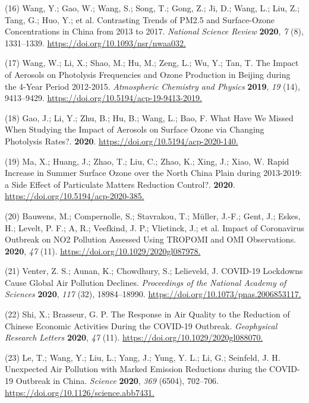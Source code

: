 \documentclass[10pt]{article}
\begin{document}
\label{csl:16}(16) Wang, Y.; Gao, W.; Wang, S.; Song, T.; Gong, Z.; Ji, D.; Wang, L.; Liu, Z.; Tang, G.; Huo, Y.; et al. {Contrasting Trends of {PM}2.5 and Surface-Ozone Concentrations in China from 2013 to 2017}. \textit{National Science Review} \textbf{2020}, \textit{7} (8), 1331–1339. \url{https://doi.org/10.1093/nsr/nwaa032.}

\label{csl:17}(17) Wang, W.; Li, X.; Shao, M.; Hu, M.; Zeng, L.; Wu, Y.; Tan, T. {The Impact of Aerosols on Photolysis Frequencies and Ozone Production in  Beijing during the 4-Year Period 2012-2015}. \textit{Atmospheric Chemistry and Physics} \textbf{2019}, \textit{19} (14), 9413–9429. \url{https://doi.org/10.5194/acp-19-9413-2019.}

\label{csl:18}(18) Gao, J.; Li, Y.; Zhu, B.; Hu, B.; Wang, L.; Bao, F. {What Have We Missed When Studying the Impact of Aerosols on Surface Ozone via Changing Photolysis Rates?}. \textbf{2020}. \url{https://doi.org/10.5194/acp-2020-140.}

\label{csl:19}(19) Ma, X.; Huang, J.; Zhao, T.; Liu, C.; Zhao, K.; Xing, J.; Xiao, W. {Rapid Increase in Summer Surface Ozone over the North China Plain during 2013-2019: a Side Effect of Particulate Matters Reduction Control?}. \textbf{2020}. \url{https://doi.org/10.5194/acp-2020-385.}

\label{csl:20}(20) Bauwens, M.; Compernolle, S.; Stavrakou, T.; Müller, J.-F.; Gent, J.; Eskes, H.; Levelt, P. F.; A, R.; Veefkind, J. P.; Vlietinck, J.; et al. {Impact of Coronavirus Outbreak on NO2 Pollution Assessed Using TROPOMI and OMI Observations}. \textbf{2020}, \textit{47} (11). \url{https://doi.org/10.1029/2020gl087978.}

\label{csl:21}(21) Venter, Z. S.; Aunan, K.; Chowdhury, S.; Lelieveld, J. {{COVID}-19 Lockdowns Cause Global Air Pollution Declines}. \textit{Proceedings of the National Academy of Sciences} \textbf{2020}, \textit{117} (32), 18984–18990. \url{https://doi.org/10.1073/pnas.2006853117.}

\label{csl:22}(22) Shi, X.; Brasseur, G. P. {The Response in Air Quality to the Reduction of Chinese Economic Activities During the {COVID}-19 Outbreak}. \textit{Geophysical Research Letters} \textbf{2020}, \textit{47} (11). \url{https://doi.org/10.1029/2020gl088070.}

\label{csl:23}(23) Le, T.; Wang, Y.; Liu, L.; Yang, J.; Yung, Y. L.; Li, G.; Seinfeld, J. H. {Unexpected Air Pollution with Marked Emission Reductions during the {COVID}-19 Outbreak in China}. \textit{Science} \textbf{2020}, \textit{369} (6504), 702–706. \url{https://doi.org/10.1126/science.abb7431.}
\end{document}
